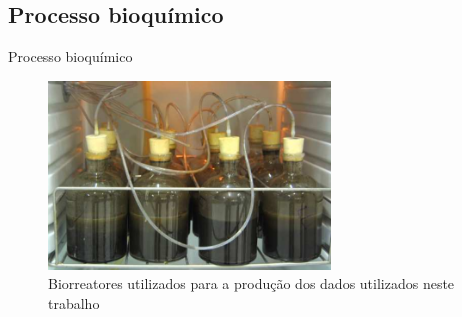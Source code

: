 \documentclass[10pt]{beamer}
\begin{document}
\subsection{Processo bioquímico}
\begin{frame}[fragile]{Processo bioquímico}
\begin{center}
\begin{figure}
\includegraphics[height=5cm]{figures/biorreator.png}
\caption{Biorreatores utilizados para a produção dos dados utilizados neste trabalho}
\end{figure}
\end{center}
\end{frame}

\end{document}
